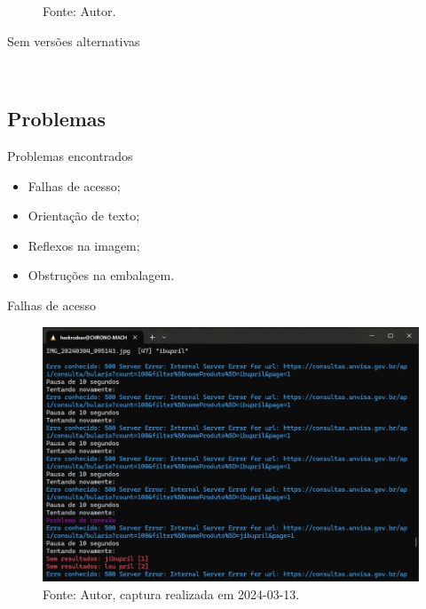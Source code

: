 \begin{frame}
	\begin{figure}
		\caption*{Gráfico de acurácia do sistema somente para casos lidos corretamente, com \num{975} itens.}
		\centering
		
		\caption*{Fonte: Autor.}
	\end{figure}
\end{frame}

\begin{frame}{Sem versões alternativas}
	\begin{table}
		\centering
		\caption*{Acurácia geral do sistema sem versões alternativas de imagem e acurácia somente para casos lidos corretamente.}
		\\\vspace{\floatsep}
		\caption*{Fonte: Autor.}
	\end{table}
\end{frame}

\subsection{Problemas}
\begin{frame}{Problemas encontrados}
	\begin{itemize}
		\item Falhas de acesso;
		\item Orientação de texto;
		\item Reflexos na imagem;
		\item Obstruções na embalagem.
	\end{itemize}
\end{frame}

\begin{frame}{Falhas de acesso}
	\begin{figure}
	    \centering
	    \caption*{Sistema tentando acessar o Bulário Eletrônico, fora do horário comercial.}
	    \includegraphics[height=0.7\textheight]{../pictures/Anvisa_domingo.png}
	    \caption*{Fonte: Autor, captura realizada em 2024-03-13.}
	\end{figure}
\end{frame}

